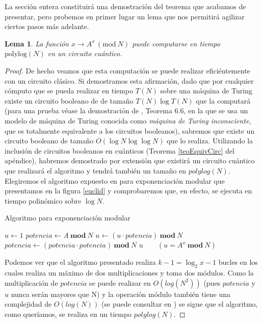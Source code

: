 \documentclass[11pt, spanish]{report}
\makeatletter
\numberwithin{equation}{section}
\newtheorem{lema}[defin]{Lema}
\numberwithin{defin}{section}
\newenvironment{megaalgorithm}[1][htb]{%
    \renewcommand{\ALG@name}{Algoritmo}%
   \begin{algorithm}[#1]%
  }{\end{algorithm}}
\newenvironment{yellowBox}{\begin{tcolorbox}[colback=yellow!5!white,colframe=yellow!75!black]}{\end{tcolorbox}}
\makeatother
\begin{document}
La sección entera constituirá una demostración del teorema que acabamos de presentar, pero probemos en primer lugar un lema que nos permitirá agilizar ciertos pasos más adelante.\\

\begin{yellowBox}
\begin{lema}\label{shor:lema1} 
La función $x \rightarrow A^x\, (\text{mod}\ N) $ puede computarse en tiempo $\text{polylog}(N)$ en un circuito cuántico. 
\end{lema}
\end{yellowBox}

\begin{proof}

De hecho veamos que esta computación se puede realizar eficiéntemente con un circuito clásico. Si demostramos esta afirmación, dado que por cualquier cómputo que se pueda realizar en tiempo $T(N)$ sobre una máquina de Turing existe un circuito booleano de de tamaño $T(N)\log T(N)$ que la computará (para una prueba véase la demostración de \cite{arora2009computational}, Teorema 6.6, en la que se usa un modelo de máquina de Turing conocida como \emph{máquina de Turing inconsciente}, que es totalmente equivalente a los circuitos booleanos), sabremos que existe un circuito booleano de tamaño $O(\log N \log\log N)$ que lo realiza. Utilizando la inclusión de circuitos booleanos en cuánticos (Teorema \ref{teoEquivCirc} del apéndice), habremos demostrado por extensión que existirá un circuito cuántico que realizará el algoritmo y tendrá también un tamaño en $polylog(N)$. Elegiremos el algoritmo expuesto en \cite{rosen2003discrete} para exponenciación modular que presentamos en la figura \ref{euclid} y comprobaremos que, en efecto, se ejecuta en tiempo polinómico sobre $\log N$.\\

\begin{megaalgorithm}
\caption{Algoritmo para exponenciación modular}\label{euclid}
\begin{algorithmic}[1]
\State $u \gets 1$
\State $potencia \gets A\ \mathbf{mod}\ N$
 $u \gets (u\cdot potencia)\ \mathbf{mod}\ N$
\EndIf
$potencia \gets (potencia\cdot potencia)\ \mathbf{mod}\ N $
\EndFor
\Return $u\qquad (u=A^x \ \mathbf{mod}\ N )$
\EndProcedure
\end{algorithmic}
\end{megaalgorithm}

Podemos ver que el algoritmo presentado realiza $k-1=\log_2x-1$ bucles en los cuales realiza un máximo de dos multiplicaciones y toma dos módulos. Como la multiplicación de $potencia$ se puede realizar en $O(log(N^2))$ (pues $potencia$ y $u$ nunca serán mayores que N) y la operación módulo también tiene una complejidad de $O(log(N))$ (se puede consultar en \cite{brent2010modern}) se sigue que el algoritmo, como queríamos, se realiza en un tiempo $polylog(N)$.
\end{proof}
\end{document}
